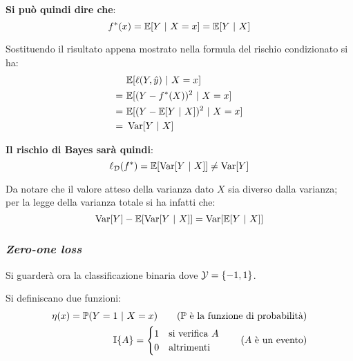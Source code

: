\textbf{Si può quindi dire che}:
$$ f^*(x) = \E[Y\ | \ X=x]  = \E[Y\ | \ X]$$

Sostituendo il risultato appena mostrato nella formula del rischio condizionato
si ha:
$$ \begin{aligned}
    \ & \mathbb{E}[\ell(Y,\hat{y})\ | \ X=x] \\ 
    = \ &\mathbb{E}[(Y-f^*(X))^2\ | \ X=x] \\
    = \ &\mathbb{E}[(Y-\mathbb{E}[Y \ | \ X ])^2\ | \ X=x] \\
    = \ & \operatorname*{Var}[Y \ | \ X]
\end{aligned} $$

\textbf{Il rischio di Bayes sarà quindi}:
$$ \ell_{\mathcal{D}}(f^*) = \mathbb{E}[\operatorname*{Var}[Y \ | \ X]] \neq \operatorname*{Var}[Y] $$

Da notare che il valore atteso della varianza dato $X$ sia diverso dalla varianza;
per la legge della varianza totale si ha infatti che:
$$ \operatorname*{Var}[Y]-\mathbb{E}[\operatorname*{Var}[Y \ | \ X]] = \operatorname*{Var}[\mathbb{E}[Y \ | \ X]] $$

\subsubsection{\textit{Zero-one loss}}
Si guarderà ora la classificazione binaria dove $\mathcal{Y} = \{-1,1\}$.

Si definiscano due funzioni:
\begin{align}
\eta(x) = \Prob(Y=1 \ | \ X=x) \tag{\Prob \ è la funzione di probabilità}\\
\I\{A\} = \begin{cases}
1 & \text{si verifica $A$} \\
0 & \text{altrimenti}\\
\end{cases}\tag{$A$ è un evento}
\end{align}

